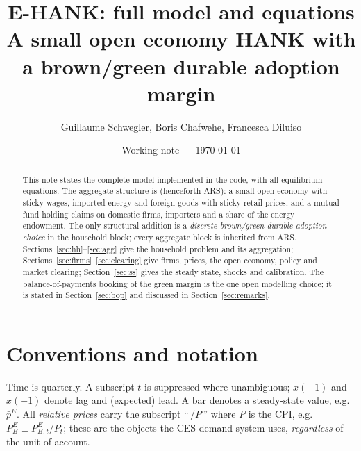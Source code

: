 \documentclass[11pt]{article}
\title{\textbf{E-HANK: full model and equations}\\[2pt]
\large A small open economy HANK with a brown/green durable adoption margin}
\author{Guillaume Schwegler, Boris Chafwehe, Francesca Diluiso}
\date{Working note --- \today}
\newcommand{\PEB}{P^{E}_{B}}
\newcommand{\pE}{p^{E}}
\begin{document}
\maketitle

\begin{abstract}
\noindent This note states the complete model implemented in the code, with all
equilibrium equations. The aggregate structure is \cite{ARS2024} (henceforth
ARS): a small open economy with sticky wages, imported energy and foreign goods
with sticky retail prices, and a mutual fund holding claims on domestic firms,
importers and a share of the energy endowment. The only structural addition is
a \emph{discrete brown/green durable adoption choice} in the household block;
every aggregate block is inherited from ARS. Sections~\ref{sec:hh}--\ref{sec:agg}
give the household problem and its aggregation; Sections~\ref{sec:firms}--\ref{sec:clearing}
give firms, prices, the open economy, policy and market clearing;
Section~\ref{sec:ss} gives the steady state, shocks and calibration.
The balance-of-payments booking of the green margin is the one open modelling
choice; it is stated in Section~\ref{sec:bop} and discussed in
Section~\ref{sec:remarks}.
\end{abstract}

\section{Conventions and notation}

Time is quarterly. A subscript $t$ is suppressed where unambiguous; $x(-1)$ and
$x(+1)$ denote lag and (expected) lead. A bar denotes a steady-state value,
e.g. $\bar\pE$. All \emph{relative prices} carry the subscript ``\,$/P$\,''
where $P$ is the CPI, e.g. $\PEB\equiv \PEB{}_{,t}/P_t$; these are the objects
the CES demand system uses, \emph{regardless} of the unit of account.
\end{document}
